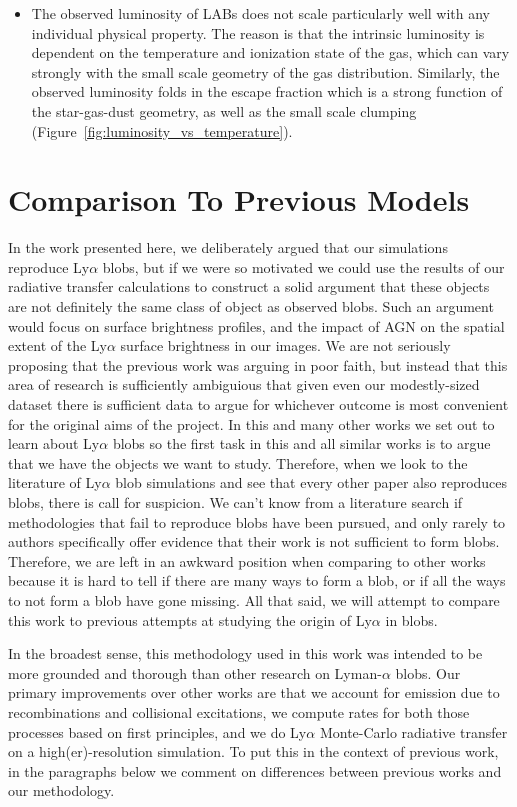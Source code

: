\begin{itemize}
    \item The observed luminosity of LABs does not scale particularly well with any individual physical property.  The reason is that the intrinsic luminosity is dependent on the temperature and ionization state of the gas, which can vary strongly with the small scale geometry of the gas distribution.  Similarly, the observed luminosity folds in the escape fraction which is a strong function of the star-gas-dust geometry, as well as the small scale clumping  (Figure~\ref{fig:luminosity_vs_temperature}).
    
\end{itemize}


\section{Comparison To Previous Models}
In the work presented here, we deliberately argued that our simulations reproduce Ly$\alpha$ blobs, but if we were so motivated we could use the results of our radiative transfer calculations to construct a solid argument that these objects are not definitely the same class of object as observed blobs.
Such an argument would focus on surface brightness profiles, and the impact of AGN on the spatial extent of the Ly$\alpha$ surface brightness in our images.
We are not seriously proposing that the previous work was arguing in poor faith, but instead that this area of research is sufficiently ambiguious that given even our modestly-sized dataset there is sufficient data to argue for whichever outcome is most convenient for the original aims of the project.
In this and many other works we set out to learn about Ly$\alpha$ blobs so the first task in this and all similar works is to argue that we have the objects we want to study.
Therefore, when we look to the literature of Ly$\alpha$ blob simulations and see that every other paper also reproduces blobs, there is call for suspicion.
We can't know from a literature search if methodologies that fail to reproduce blobs have been pursued, and only rarely to authors specifically offer evidence that their work is not sufficient to form blobs.
Therefore, we are left in an awkward position when comparing to other works because it is hard to tell if there are many ways to form a blob, or if all the ways to not form a blob have gone missing.
All that said, we will attempt to compare this work to previous attempts at studying the origin of Ly$\alpha$ in blobs.

In the broadest sense, this methodology used in this work was intended to be more grounded and thorough than other research on Lyman-$\alpha$ blobs.
Our primary improvements over other works are that we account for emission due to recombinations and collisional excitations, we compute rates for both those processes based on first principles, and we do Ly$\alpha$ Monte-Carlo radiative transfer on a high(er)-resolution simulation.
To put this in the context of previous work, in the paragraphs below we comment on differences between previous works and our methodology.

